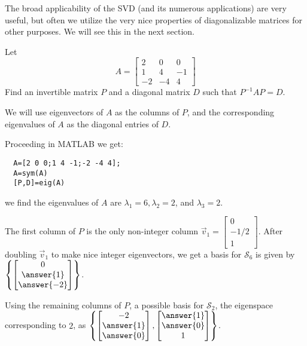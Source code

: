 \documentclass{ximera}
\begin{document}
The broad applicability of the SVD (and its numerous applications) are very useful, but often we utilize the very nice properties of diagonalizable matrices for other purposes. We will see this in the next section. 

\begin{example}\label{ex:diagonalizematrix}
  Let
  \begin{equation*}
  A=\begin{bmatrix}
  2 & 0 & 0 \\
  1 & 4 & -1 \\
  -2 & -4 & 4
  \end{bmatrix}
  \end{equation*}
   Find an invertible matrix $P$ and a diagonal matrix $D$ such that $P^{-1}AP=D$.
   
 
  We will use eigenvectors of $A$ as the columns of $P$, and
  the corresponding eigenvalues of $A$ as the diagonal entries of $D$. 
  
  Proceeding in MATLAB we get:
  
  \begin{verbatim}
  A=[2 0 0;1 4 -1;-2 -4 4];
  A=sym(A)
  [P,D]=eig(A)
  \end{verbatim}
  
  we find the eigenvalues of $A$ are $\lambda_1 =6,\lambda_2 = 2$, and $\lambda_3 = 2$. 
  

  The first column of $P$ is the only non-integer column $\vec{v}_1=\begin{bmatrix}0\\-1/2\\1\end{bmatrix}$. After doubling $\vec{v}_1$ to make nice integer eigenvectors, we get a basis for $\mathcal{S}_6$ is given by
  $\left\{\begin{bmatrix}
  0 \\
  \answer{1} \\
  \answer{-2}
  \end{bmatrix}\right\}$.

  Using the remaining columns of $P$, a possible basis for $\mathcal{S}_2$, the eigenspace corresponding to $2$, as
  $\left\{
  \begin{bmatrix}
  -2 \\
  \answer{1} \\
  \answer{0}
  \end{bmatrix},
  \begin{bmatrix}
  \answer{1} \\
  \answer{0} \\
  1
  \end{bmatrix}
  \right\}$.
   

\end{example}
\end{document}
